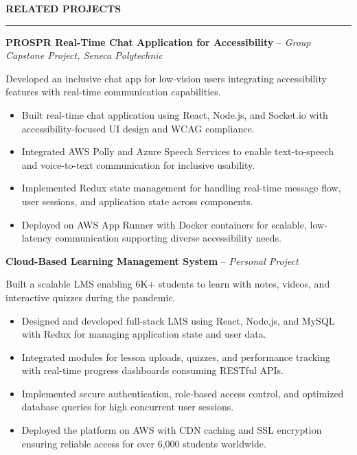 \documentclass[10pt,letterpaper]{article}
\begin{document}
\vspace{6pt}

\textbf{RELATED PROJECTS}\\[-8pt]
\noindent\rule{\textwidth}{1pt}

\vspace{-2pt}

\textbf{PROSPR  Real-Time Chat Application for Accessibility} -- \emph{Group Capstone Project, Seneca Polytechnic }

\vspace{-1pt}

Developed an inclusive chat app for low-vision users integrating accessibility features with real-time communication capabilities.
\vspace{-1pt}
\begin{itemize}
\item Built real-time chat application using React, Node.js, and Socket.io with accessibility-focused UI design and WCAG compliance.
\item Integrated AWS Polly and Azure Speech Services to enable text-to-speech and voice-to-text communication for inclusive usability.
\item Implemented Redux state management for handling real-time message flow, user sessions, and application state across components.
\item Deployed on AWS App Runner with Docker containers for scalable, low-latency communication supporting diverse accessibility needs.
\end{itemize}

\textbf{Cloud-Based Learning Management System} -- \emph{Personal Project}

\vspace{-1pt}

Built a scalable LMS enabling 6K+ students to learn with notes, videos, and interactive quizzes during the pandemic.
\vspace{-1pt}
\begin{itemize}
\item Designed and developed full-stack LMS using React, Node.js, and MySQL with Redux for managing application state and user data.
\item Integrated modules for lesson uploads, quizzes, and performance tracking with real-time progress dashboards consuming RESTful APIs.
\item Implemented secure authentication, role-based access control, and optimized database queries for high concurrent user sessions.
\item Deployed the platform on AWS with CDN caching and SSL encryption ensuring reliable access for over 6,000 students worldwide.
\end{itemize}
\end{document}
